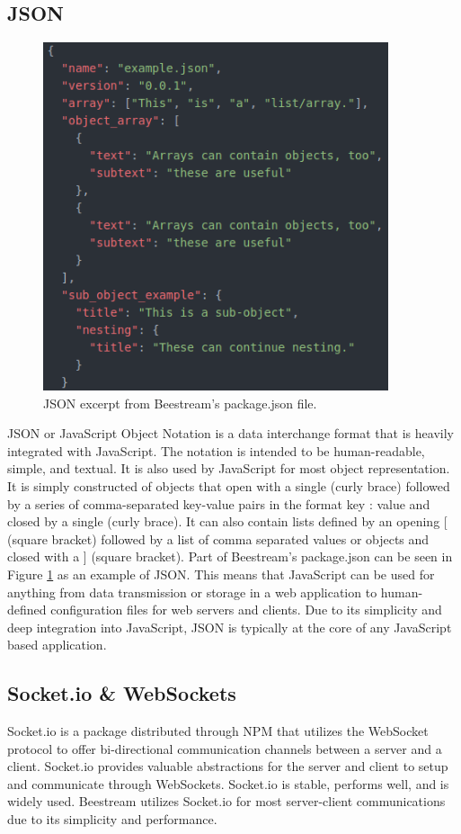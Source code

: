 \subsection{JSON}
\begin{figure}
    \centering
    \includegraphics[width=4in]{images/Thesis_JSON.png}
    \caption{JSON excerpt from Beestream's package.json file.}
    \label{fig:json}
 \end{figure}
JSON or JavaScript Object Notation \cite{json} is a data interchange format that is heavily integrated with JavaScript.  The notation is intended to be human-readable, simple, and textual.  It is also used by JavaScript for most object representation.  It is simply constructed of objects that open with a single { (curly brace) followed by a series of comma-separated key-value pairs in the format key : value and closed by a single } (curly brace).  It can also contain lists defined by an opening [ (square bracket) followed by a list of comma separated values or objects and closed with a ] (square bracket).  Part of Beestream’s package.json can be seen in Figure \ref{fig:json} as an example of JSON. This means that JavaScript can be used for anything from data transmission or storage in a web application to human-defined configuration files for web servers and clients.  Due to its simplicity and deep integration into JavaScript, JSON is typically at the core of any JavaScript based application. \par

\subsection{Socket.io & WebSockets}
Socket.io \cite{socket} is a package distributed through NPM that utilizes the WebSocket protocol to offer bi-directional communication channels between a server and a client.  Socket.io provides valuable abstractions for the server and client to setup and communicate through WebSockets.  Socket.io is stable, performs well, and is widely used.  Beestream utilizes Socket.io for most server-client communications due to its simplicity and performance. \par

